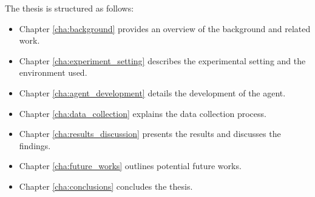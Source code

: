 The thesis is structured as follows:
\begin{itemize}
  \item Chapter \ref{cha:background} provides an overview of the background and related
    work.

  \item Chapter \ref{cha:experiment_setting} describes the experimental setting and
    the environment used.

  \item Chapter \ref{cha:agent_development} details the development of the agent.

  \item Chapter \ref{cha:data_collection} explains the data collection process.

  \item Chapter \ref{cha:results_discussion} presents the results and discusses the
    findings.

  \item Chapter \ref{cha:future_works} outlines potential future works.

  \item Chapter \ref{cha:conclusions} concludes the thesis.
\end{itemize}